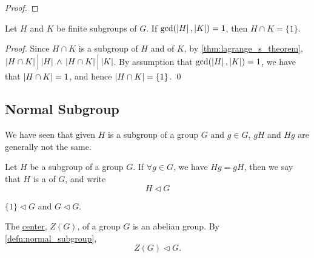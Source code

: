 \begin{proof}
\end{proof}

\begin{crly}
\label{crly:lagrange_s_theorem_crly3}
  Let $H$ and $K$ be finite subgroups of $G$. If $\gcd(\left|H\right|, \left|K\right|) = 1$, then $H \cap K = \{1\}$.
\end{crly}

\begin{proof}
  Since $H \cap K$ is a subgroup of $H$ and of $K$, by \autoref{thm:lagrange_s_theorem}, $\left|H \cap K\right| \Big| \left|H\right| \, \land \, \left|H \cap K\right| \Big| \left|K\right|$. By assumption that $\gcd(\left|H\right|, \left|K\right|) = 1$, we have that $\left|H \cap K\right| = 1$, and hence $\left|H \cap K\right| = \{ 1 \}$. \qed
\end{proof}


\subsection{Normal Subgroup}%
\label{sub:normal_subgroup}

We have seen that given $H$ is a subgroup of a group $G$ and $g \in G$, $gH$ and $Hg$ are generally not the same.

\begin{defn}
\label{defn:normal_subgroup}
  Let $H$ be a subgroup of a group $G$. If $\forall g \in G$, we have $Hg = gH$, then we say that $H$ is a  of $G$, and write
  \begin{equation*}
    H \triangleleft G
  \end{equation*}
\end{defn}

\begin{eg}
  $\{1\} \triangleleft G$ and $G \triangleleft G$.
\end{eg}

\begin{eg}
  The \hyperref[defn:center_of_a_group]{center}, $Z(G)$, of a group $G$ is an abelian group. By \cref{defn:normal_subgroup},
  \begin{equation*}
    Z(G) \triangleleft G.
  \end{equation*}
\end{eg}

